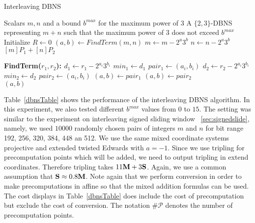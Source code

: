 \begin{algorithm}
\caption{Interleaving DBNS}
\begin{algorithmic}
	\Require Scalars $m, n$ and a bound $b^{max}$ for the maximum power of $3$
	\Ensure	A $\{2,3\}$-DBNS representing $m+n$ such that the maximum power of $3$ does not exceed $b^{max}$
	\Statex
	\State Initialize $R \gets 0$
		\State $(a,b) \gets FindTerm(m,n)$
		\State $m \gets m - 2^a3^b$
		\State $n \gets n - 2^a3^b$
	\EndWhile
	\\ \Return $[m]P_1 + [n]P_2$
\end{algorithmic}

\begin{algorithmic}
	\Statex
	\Statex
	\Statex
	\State \bf{FindTerm($r_1,r_2$):}
		\State $d_1 \gets r_1 - 2^{a_i}3^{b_i}$
			\State $min_1 \gets d_1$
			\State $pair_1 \gets (a_i,b_i)$
		\EndIf
		\State $d_2 \gets r_2 - 2^{a_i}3^{b_i}$
			\State $min_2 \gets d_2$
			\State $pair_2 \gets (a_i,b_i)$
		\EndIf
	\EndFor
		$(a,b) \gets pair_1$
	\Else
		$(a,b) \gets pair_2$
	\EndIf
	\\ \Return $(a,b)$
\end{algorithmic}

\label{interleaveDBNSAlgo}
\end{algorithm}


Table~\ref{dbnsTable} shows the performance of the interleaving DBNS algorithm.
In this experiment, we also tested different $b^{max}$ values from $0$ to $15$.
The setting was similar to the experiment on interleaving signed sliding window ~\ref{sec:signedslide},
namely, we used $10000$ randomly chosen pairs of integers $m$ and $n$ for bit range 192, 256, 320, 384, 448 an 512.
We use the same mixed coordinate systems projective and extended twisted Edwards with $a=-1$.
Since we use tripling for precomputation points which will be added, we need to output tripling in extend coordinates.
Therefore tripling takes $11\text{\bf M} + 3\text{\bf S}$.  Again, we use a common assumption that $\text{\bf S} \approx 0.8\text{\bf M}$.
Note again that we perform conversion in order to make precomputations in affine so that the mixed addition formulas can be used.
The cost displays in Table~\ref{dbnsTable} does include the cost of precomputation but exclude the cost of conversion.
The notation {$\mathcal{\#P}$} denotes the number of precomputation points.

